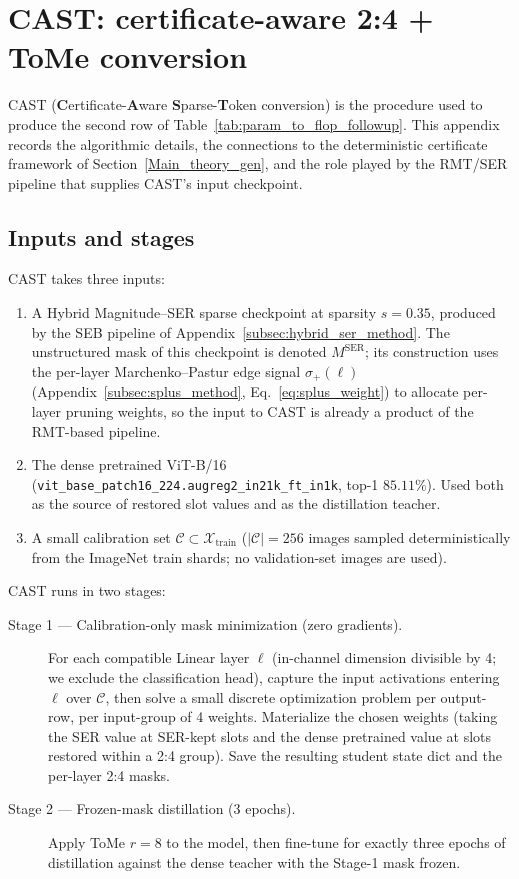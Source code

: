 \documentclass[11pt]{article}
\theoremstyle{plain}
\theoremstyle{definition}
\theoremstyle{remark}
\newcommand{\1}{\mathbf{1}}
\begin{document}
\section{CAST: certificate-aware 2:4 + ToMe conversion}
\label{app:cast}

CAST (\textbf{C}ertificate-\textbf{A}ware \textbf{S}parse-\textbf{T}oken conversion) is the procedure used to produce the second row of Table~\ref{tab:param_to_flop_followup}.  This appendix records the algorithmic details, the connections to the deterministic certificate framework of Section~\ref{Main_theory_gen}, and the role played by the RMT/SER pipeline that supplies CAST's input checkpoint.

\subsection{Inputs and stages}
\label{subsec:cast_pipeline}

CAST takes three inputs:
\begin{enumerate}
\item A Hybrid Magnitude--SER sparse checkpoint at sparsity \(s=0.35\), produced by the SEB pipeline of Appendix~\ref{subsec:hybrid_ser_method}.  The unstructured mask of this checkpoint is denoted \(M^{\mathrm{SER}}\); its construction uses the per-layer Marchenko--Pastur edge signal \(\sigma_+(\ell)\) (Appendix~\ref{subsec:splus_method}, Eq.~\eqref{eq:splus_weight}) to allocate per-layer pruning weights, so the input to CAST is already a product of the RMT-based pipeline.
\item The dense pretrained ViT-B/16 (\texttt{vit\_base\_patch16\_224.augreg2\_in21k\_ft\_in1k}, top-1 \(85.11\%\)).  Used both as the source of restored slot values and as the distillation teacher.
\item A small calibration set \(\mathcal C\subset\mathcal X_{\mathrm{train}}\) (\(|\mathcal C|=256\) images sampled deterministically from the ImageNet train shards; no validation-set images are used).
\end{enumerate}

CAST runs in two stages:
\begin{description}
\item[Stage 1 --- Calibration-only mask minimization (zero gradients).] For each compatible Linear layer \(\ell\) (in-channel dimension divisible by 4; we exclude the classification head), capture the input activations entering \(\ell\) over \(\mathcal C\), then solve a small discrete optimization problem per output-row, per input-group of 4 weights.  Materialize the chosen weights (taking the SER value at SER-kept slots and the dense pretrained value at slots restored within a 2:4 group).  Save the resulting student state dict and the per-layer 2:4 masks.
\item[Stage 2 --- Frozen-mask distillation (3 epochs).] Apply ToMe \(r=8\) \cite{bolya2023tome} to the model, then fine-tune for exactly three epochs of distillation against the dense teacher with the Stage-1 mask frozen.
\end{description}
\end{document}
